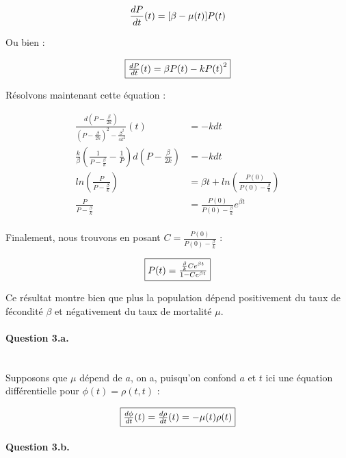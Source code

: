 \documentclass[paper=a4, french]{scrartcl} %
\numberwithin{equation}{section} %
\numberwithin{figure}{section} %
\numberwithin{table}{section} %
\begin{document}
\begin{equation*}
{dP \over dt}(t) = [\beta - \mu(t)]P(t)
\end{equation*}

Ou bien : 

\begin{equation}
\fbox{${dP \over dt}(t) = \beta P(t) - k{P(t)}^2$}
\end{equation}

Résolvons maintenant cette équation : 

\begin{equation*}
\begin{aligned}
\frac{d(P-\frac{\beta}{2k})}{{(P-\frac{\beta}{2k})}^2-\frac{\beta^2}{4k^2}}(t)  & =  -kdt \\
\frac{k}{\beta}(\frac{1}{P-\frac{\beta}{k}}-\frac{1}{P})d(P-\frac{\beta}{2k})& =  -kdt \\
ln(\frac{P}{P-\frac{\beta}{k}}) & =  \beta t + ln(\frac{P(0)}{P(0)-\frac{\beta}{k}})\\
\frac{P}{P-\frac{\beta}{k}} & = \frac{P(0)}{P(0)-\frac{\beta}{k}}e^{\beta t} \\
\end{aligned}
\end{equation*}

Finalement, nous trouvons en posant $C=\frac{P(0)}{P(0)-\frac{\beta}{k}}$ :

\begin{equation}
\fbox{$P(t) = \frac{\frac{\beta}{k}Ce^{\beta t}}{1-Ce^{\beta t}}$}
\end{equation}

Ce résultat montre bien que plus la population dépend positivement du taux de fécondité $\beta$ et négativement du taux de mortalité $\mu$. 


\paragraph{\textbf{Question 3.a.}}
~\\

Supposons que $\mu$ dépend de $a$, on a, puisqu\rq{}on confond $a$ et $t$ ici une équation différentielle pour $\phi(t) = \rho(t,t)$ :

\begin{equation}
\fbox{${d\phi \over dt}(t)  =  {d\rho \over dt}(t) = -\mu(t)\rho(t)$}
\end{equation}

\paragraph{\textbf{Question 3.b.}}
~\\
\end{document}
